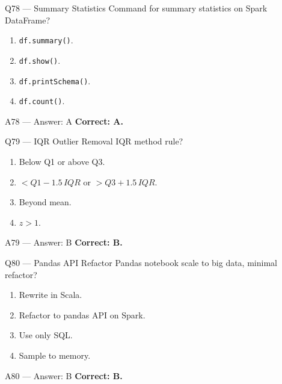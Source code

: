 \documentclass[aspectratio=169,9pt]{beamer}
\begin{document}
	
	\begin{frame}{Q78 — Summary Statistics}
		Command for summary statistics on Spark DataFrame?
		\begin{enumerate}[label=\Alph*.]
			\item \texttt{df.summary()}.
			\item \texttt{df.show()}.
			\item \texttt{df.printSchema()}.
			\item \texttt{df.count()}.
		\end{enumerate}
	\end{frame}
	
	\begin{frame}{A78 — Answer: A}
		\textbf{Correct: A.}
	\end{frame}
	
	\begin{frame}{Q79 — IQR Outlier Removal}
		IQR method rule?
		\begin{enumerate}[label=\Alph*.]
			\item Below Q1 or above Q3.
			\item $< Q1 - 1.5\,IQR$ or $> Q3 + 1.5\,IQR$.
			\item Beyond mean.
			\item $z > 1$.
		\end{enumerate}
	\end{frame}
	
	\begin{frame}{A79 — Answer: B}
		\textbf{Correct: B.}
	\end{frame}
	
	\begin{frame}{Q80 — Pandas API Refactor}
		Pandas notebook scale to big data, minimal refactor?
		\begin{enumerate}[label=\Alph*.]
			\item Rewrite in Scala.
			\item Refactor to pandas API on Spark.
			\item Use only SQL.
			\item Sample to memory.
		\end{enumerate}
	\end{frame}
	
	\begin{frame}{A80 — Answer: B}
		\textbf{Correct: B.}
	\end{frame}
	
\end{document}
